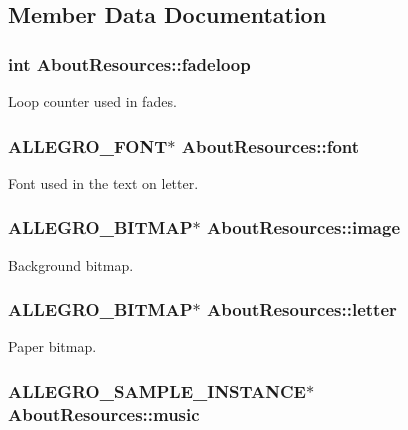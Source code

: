 \subsection{Member Data Documentation}
\hypertarget{structAboutResources_ae8bf7fbfd5f03f8c5713b65c16922924}{
\subsubsection[{fadeloop}]{\setlength{\rightskip}{0pt plus 5cm}int About\+Resources\+::fadeloop}}\label{structAboutResources_ae8bf7fbfd5f03f8c5713b65c16922924}
Loop counter used in fades. \hypertarget{structAboutResources_a2cb6da4e10371ae03afe192e545cb587}{
\subsubsection[{font}]{\setlength{\rightskip}{0pt plus 5cm}A\+L\+L\+E\+G\+R\+O\+\_\+\+F\+O\+N\+T$\ast$ About\+Resources\+::font}}\label{structAboutResources_a2cb6da4e10371ae03afe192e545cb587}
Font used in the text on letter. \hypertarget{structAboutResources_aa30fff0623b2d19c66a1142ea02a44b0}{
\subsubsection[{image}]{\setlength{\rightskip}{0pt plus 5cm}A\+L\+L\+E\+G\+R\+O\+\_\+\+B\+I\+T\+M\+A\+P$\ast$ About\+Resources\+::image}}\label{structAboutResources_aa30fff0623b2d19c66a1142ea02a44b0}
Background bitmap. \hypertarget{structAboutResources_afb1102473ef660c7cb27356953a18b06}{
\subsubsection[{letter}]{\setlength{\rightskip}{0pt plus 5cm}A\+L\+L\+E\+G\+R\+O\+\_\+\+B\+I\+T\+M\+A\+P$\ast$ About\+Resources\+::letter}}\label{structAboutResources_afb1102473ef660c7cb27356953a18b06}
Paper bitmap. \hypertarget{structAboutResources_a0a619b203cf8996238e3a509a6396596}{
\subsubsection[{music}]{\setlength{\rightskip}{0pt plus 5cm}A\+L\+L\+E\+G\+R\+O\+\_\+\+S\+A\+M\+P\+L\+E\+\_\+\+I\+N\+S\+T\+A\+N\+C\+E$\ast$ About\+Resources\+::music}}\label{structAboutResources_a0a619b203cf8996238e3a509a6396596}
